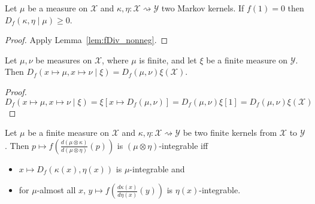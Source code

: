 \begin{lemma}
  \label{lem:condFDiv_nonneg}
  \leanok
  Let $\mu$ be a measure on $\mathcal X$ and $\kappa, \eta : \mathcal X \rightsquigarrow \mathcal Y$ two Markov kernels. If $f(1) = 0$ then $D_f(\kappa, \eta \mid \mu) \ge 0$.
\end{lemma}

\begin{proof}\leanok
{}
Apply Lemma~\ref{lem:fDiv_nonneg}.
\end{proof}


\begin{lemma}
  \label{lem:condFDiv_const}
  \leanok
  Let $\mu, \nu$ be measures on $\mathcal X$, where $\mu$ is finite, and let $\xi$ be a finite measure on $\mathcal Y$.
  Then $D_f(x \mapsto \mu, x \mapsto \nu \mid \xi) = D_f(\mu, \nu) \xi (\mathcal X)$.
\end{lemma}

\begin{proof}\leanok
\uses{}
$$D_f(x \mapsto \mu, x \mapsto \nu \mid \xi) 
= \xi\left[x \mapsto D_f(\mu, \nu)\right] 
= D_f(\mu, \nu) \xi\left[1\right] 
= D_f(\mu, \nu) \xi (\mathcal X)$$
\end{proof}


\begin{lemma}
  \label{lem:integrable_fDiv_compProd_iff}
  \leanok
  Let $\mu$ be a finite measure on $\mathcal X$ and $\kappa, \eta : \mathcal X \rightsquigarrow \mathcal Y$ be two finite kernels from $\mathcal X$ to $\mathcal Y$.
  Then $p \mapsto f \left(\frac{d(\mu \otimes \kappa)}{d(\mu \otimes \eta)}(p)\right)$ is $(\mu \otimes \eta)$-integrable iff
  \begin{itemize}
    \item $x \mapsto D_f(\kappa(x), \eta(x))$ is $\mu$-integrable and
    \item for $\mu$-almost all $x$, $y \mapsto f \left( \frac{d\kappa(x)}{d\eta(x)}(y) \right)$ is $\eta(x)$-integrable. 
  \end{itemize}
\end{lemma}

